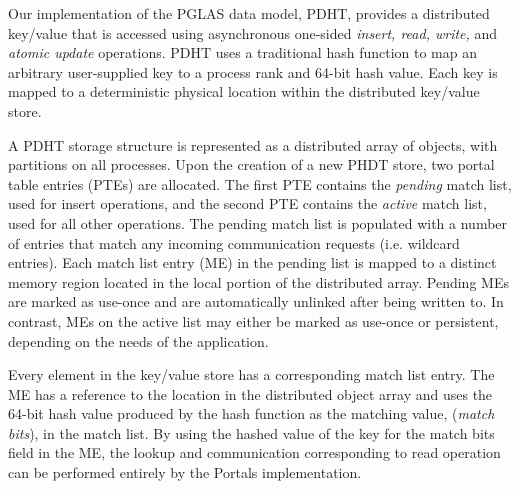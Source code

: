 

Our implementation of the PGLAS data model, PDHT, provides a distributed
key/value that is accessed using asynchronous one-sided {\em insert, read,
write,} and {\em atomic update} operations. PDHT uses a traditional hash
function\cite{cityhash} to map an arbitrary user-supplied key to a process rank
and 64-bit hash value. Each key is mapped to a deterministic physical
location within the distributed key/value store.

A PDHT storage structure is represented as a distributed array of objects, with
partitions on all processes. Upon the creation of a new PHDT store, two portal
table entries (PTEs) are allocated. The first PTE contains the {\em pending}
match list, used for insert operations, and the second PTE contains the {\em
active} match list, used for all other operations. The pending match list is
populated with a number of entries that match any incoming communication
requests (i.e. wildcard entries). Each match list entry (ME) in the pending
list is mapped to a distinct memory region located in the local portion of the
distributed array. Pending MEs are marked as use-once and are automatically
unlinked after being written to. In contrast, MEs on the active list may either
be marked as use-once or persistent, depending on the needs of the application.

Every element in the key/value store has a corresponding match list entry. The
ME has a reference to the location in the distributed object array and uses
the 64-bit hash value produced by the hash function as the matching value,
({\em match bits}), in the match list. By using the hashed value of the key
for the match bits field in the ME, the lookup and communication corresponding 
to read operation can be performed entirely by the Portals implementation.



%


